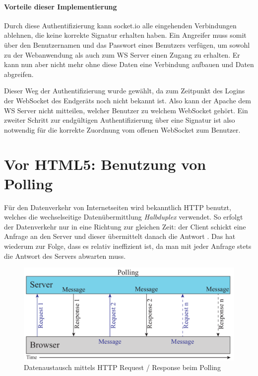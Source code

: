 \paragraph{Vorteile dieser Implementierung}
Durch diese Authentifizierung kann socket.io alle eingehenden Verbindungen ablehnen, die keine korrekte Signatur erhalten haben. Ein Angreifer muss somit über den Benutzernamen und das Passwort eines Benutzers verfügen, um sowohl zu der Webanwendung als auch zum WS Server einen Zugang zu erhalten. Er kann nun aber nicht mehr ohne diese Daten eine Verbindung aufbauen und Daten abgreifen.\par

Dieser Weg der Authentifizierung wurde gewählt, da zum Zeitpunkt des Logins der WebSocket des Endgeräts noch nicht bekannt ist. Also kann der Apache dem WS Server nicht mitteilen, welcher Benutzer zu welchem WebSocket gehört. Ein zweiter Schritt zur endgültigen Authentifizierung über eine Signatur ist also notwendig für die korrekte Zuordnung vom offenen WebSocket zum Benutzer. 


\section{Vor HTML5: Benutzung von Polling}
Für den Datenverkehr von Internetseiten wird bekanntlich HTTP benutzt, welches die wechselseitige Datenübermittlung \emph{Halbduplex} verwendet. So erfolgt der Datenverkehr nur in eine Richtung zur gleichen Zeit: der Client schickt eine Anfrage an den Server und dieser übermittelt danach die Antwort \cite[S. 5]{ws}. Das hat wiederum zur Folge, dass es relativ ineffizient ist, da man mit jeder Anfrage stets die Antwort des Servers abwarten muss.\par

\begin{figure}[!ht]
	\centering
	\includegraphics[width=15cm]{fig/polling}
	\caption[Datenaustausch beim Polling]{Datenaustausch mittels HTTP Request / Response beim Polling {\cite[S. 7]{ws}}}
\end{figure}

